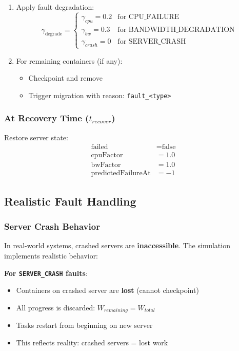 \documentclass[12pt,a4paper]{article}
\begin{document}
\begin{enumerate}
    \item Apply fault degradation:
    \begin{equation}
        \gamma_{\text{degrade}} = \begin{cases}
            \gamma_{cpu} = 0.2 & \text{for CPU\_FAILURE} \\
            \gamma_{bw} = 0.3 & \text{for BANDWIDTH\_DEGRADATION} \\
            \gamma_{crash} = 0 & \text{for SERVER\_CRASH}
        \end{cases}
    \end{equation}
    \item For remaining containers (if any):
    \begin{itemize}
        \item Checkpoint and remove
        \item Trigger migration with reason: \texttt{fault\_<type>}
    \end{itemize}
\end{enumerate}

\subsubsection{At Recovery Time ($t_{recover}$)}

Restore server state:
\begin{align}
    \text{failed} &= \text{false} \\
    \text{cpuFactor} &= 1.0 \\
    \text{bwFactor} &= 1.0 \\
    \text{predictedFailureAt} &= -1
\end{align}

\subsection{Realistic Fault Handling}

\subsubsection{Server Crash Behavior}

In real-world systems, crashed servers are \textbf{inaccessible}. The simulation implements realistic behavior:

\textbf{For \texttt{SERVER\_CRASH} faults}:
\begin{itemize}
    \item Containers on crashed server are \textbf{lost} (cannot checkpoint)
    \item All progress is discarded: $W_{remaining} = W_{total}$
    \item Tasks restart from beginning on new server
    \item This reflects reality: crashed servers = lost work
\end{itemize}
\end{document}
